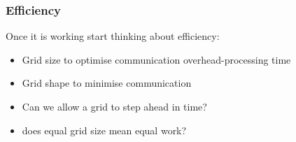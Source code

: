 \documentclass{beamer}
\begin{document}
        \begin{frame}
        	\frametitle{Efficiency}
        	Once it is working start thinking about efficiency:
        	\begin{itemize}
        		\item Grid size to optimise communication overhead-processing time 
        		\item Grid shape to minimise communication
        		\item Can we allow a grid to step ahead in time?
        		\item does equal grid size mean equal work?
        	\end{itemize}
        \end{frame}       	
        	
  

        
\end{document}
